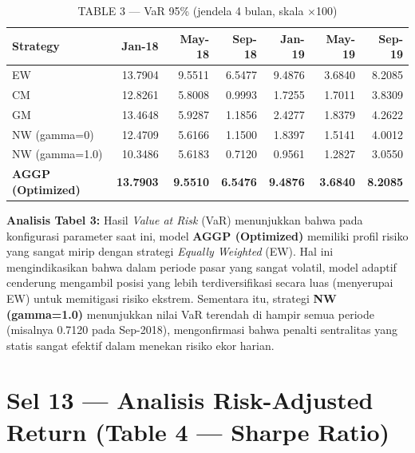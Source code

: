 \documentclass[12pt,a4paper]{article}
\begin{document}
\vspace{6pt}
\begin{table}[H]
  \centering
  \caption{TABLE 3 --- VaR 95\% (jendela 4 bulan, skala $\times$100)}
  \small
  \begin{tabular}{lrrrrrr}
    \toprule
    \textbf{Strategy} & \textbf{Jan-18} & \textbf{May-18} & \textbf{Sep-18} & \textbf{Jan-19} & \textbf{May-19} & \textbf{Sep-19} \\
    \midrule
    \midrule
    EW                        & 13.7904 & 9.5511 & 6.5477 & 9.4876 & 3.6840 & 8.2085 \\
    CM                        & 12.8261 & 5.8008 & 0.9993 & 1.7255 & 1.7011 & 3.8309 \\
    GM                        & 13.4648 & 5.9287 & 1.1856 & 2.4277 & 1.8379 & 4.2622 \\
    NW (gamma=0)              & 12.4709 & 5.6166 & 1.1500 & 1.8397 & 1.5141 & 4.0012 \\
    NW (gamma=1.0)            & 10.3486 & 5.6183 & 0.7120 & 0.9561 & 1.2827 & 3.0550 \\
    \textbf{AGGP (Optimized)} & \textbf{13.7903} & \textbf{9.5510} & \textbf{6.5476} & \textbf{9.4876} & \textbf{3.6840} & \textbf{8.2085} \\
    \bottomrule
  \end{tabular}
\end{table}

\textbf{Analisis Tabel 3:} Hasil \textit{Value at Risk} (VaR) menunjukkan bahwa pada konfigurasi parameter saat ini, model \textbf{AGGP (Optimized)} memiliki profil risiko yang sangat mirip dengan strategi \textit{Equally Weighted} (EW). Hal ini mengindikasikan bahwa dalam periode pasar yang sangat volatil, model adaptif cenderung mengambil posisi yang lebih terdiversifikasi secara luas (menyerupai EW) untuk memitigasi risiko ekstrem. Sementara itu, strategi \textbf{NW (gamma=1.0)} menunjukkan nilai VaR terendah di hampir semua periode (misalnya 0.7120 pada Sep-2018), mengonfirmasi bahwa penalti sentralitas yang statis sangat efektif dalam menekan risiko ekor harian.

\section{Sel 13 --- Analisis Risk-Adjusted Return (Table 4 --- Sharpe Ratio)}
\end{document}

